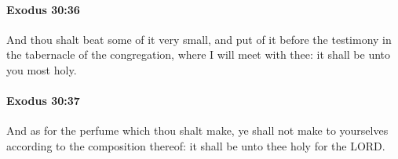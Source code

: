 		\paragraph{Exodus 30:36} %
			\label{EXODUS-30-36}

			And thou shalt beat some of it very small, and put of it before the testimony in the tabernacle of the congregation, where I will meet with thee: it shall be unto you most holy.


		\paragraph{Exodus 30:37} %
			\label{EXODUS-30-37}

			And as for the perfume which thou shalt make, ye shall not make to yourselves according to the composition thereof: it shall be unto thee holy for the LORD.


